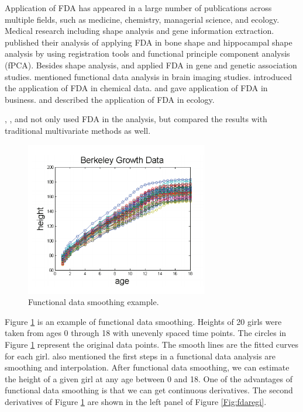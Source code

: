 \documentclass{article}
\begin{document}
Application of FDA has appeared in a large number of publications across multiple fields, such as medicine, chemistry, managerial science, and ecology.
Medical research including shape analysis and gene information extraction. 
\citet{epifanio2011functional,epifanio2014hippocampal} published their analysis of applying FDA in bone shape and hippocampal shape analysis by using registration tools and functional principle component analysis (fPCA). Besides shape analysis, \citet{leng2006classification} and \citet{reimherr2014functional} applied FDA in gene and genetic association studies. \citet{tian2010functional} mentioned functional data analysis in brain imaging studies. 
\citet{burfield2015review} introduced the application of FDA in chemical data. 
\citet{dass2012introducing} and \citet{muelas2016facing} gave application of FDA in business. \citet{gorrostieta2014characterization} and \citet{martinez2014air} described the application of FDA in ecology. 

\citet{martinez2014air}, \citet{reimherr2014functional}, and \citet{nikitovic2011functional} not only used FDA in the analysis, but compared the results with traditional multivariate methods as well.

\begin{figure}[!ht]
\centering
\includegraphics[width=8cm]{egsmooth.png}
\caption{Functional data smoothing example. \citep{FDAGiles}}
\label{Fig:fdasmooth}
\end{figure}

Figure \ref{Fig:fdasmooth} is an example of functional data smoothing. Heights of 20 girls were taken from ages 0 through 18 with unevenly spaced time points. The circles in Figure \ref{Fig:fdasmooth} represent the original data points. The smooth lines are the fitted curves for each girl.
\citet{ramsay2006functional} also mentioned the first steps in a functional data analysis are smoothing and interpolation. 
After functional data smoothing, we can estimate the height of a given girl at any age between 0 and 18. One of the advantages of functional data smoothing is that we can get continuous derivatives. The second derivatives of Figure \ref{Fig:fdasmooth} are shown in the left panel of Figure \ref{Fig:fdaregi}.
\end{document}
